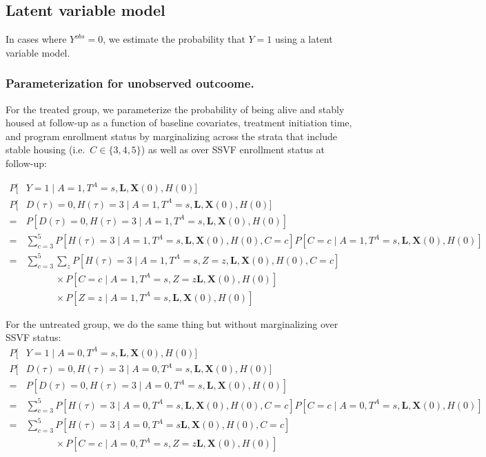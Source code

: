 
\subsection{Latent variable model}

In cases where $Y^{obs}=0$, we estimate the probability that $Y=1$ using a latent variable model. 

\subsubsection{Parameterization for unobserved outcoome.}

For the treated group, we parameterize the probability of being alive and stably housed at follow-up as a function of baseline covariates, treatment initiation time, and program enrollment status by marginalizing across the strata that include stable housing (i.e.\ $C \in \{3,4,5\}$) as well as over SSVF enrollment status at follow-up:

\begin{align*}
    P[&Y=1 \mid A=1, T^A=s, \boldsymbol{L}, \boldsymbol{X}(0), H(0)] \\
    P[&D(\tau)=0, H(\tau)=3 \mid A=1, T^A=s, \boldsymbol{L}, \boldsymbol{X}(0), H(0)] \\
     =& P[D(\tau)=0, H(\tau)=3 \mid A=1, T^A=s, \boldsymbol{L}, \boldsymbol{X}(0), H(0)] \\
     =& \sum_{c=3}^5 P[H(\tau)=3 \mid A=1, T^A=s, \boldsymbol{L}, \boldsymbol{X}(0), H(0), C=c]P[C=c \mid A=1, T^A=s, \boldsymbol{L}, \boldsymbol{X}(0), H(0)] \\
     =& \sum_{c=3}^5 \sum_{z} P[H(\tau)=3 \mid A=1, T^A=s, Z=z, \boldsymbol{L}, \boldsymbol{X}(0), H(0), C=c]\\
     & \quad \quad \quad \times P[C=c \mid A=1, T^A=s, Z=z \boldsymbol{L}, \boldsymbol{X}(0), H(0)] \\
     &\quad \quad \quad \times P[Z=z \mid A=1, T^A=s, \boldsymbol{L}, \boldsymbol{X}(0), H(0)]
\end{align*}

For the untreated group, we do the same thing but without marginalizing over SSVF status:
\begin{align*}
    P[&Y=1 \mid A=0, T^A=s, \boldsymbol{L}, \boldsymbol{X}(0), H(0)] \\
    P[&D(\tau)=0, H(\tau)=3 \mid A=0, T^A=s, \boldsymbol{L}, \boldsymbol{X}(0), H(0)] \\
     =& P[D(\tau)=0, H(\tau)=3 \mid A=0, T^A=s, \boldsymbol{L}, \boldsymbol{X}(0), H(0)] \\
     =& \sum_{c=3}^5 P[H(\tau)=3 \mid A=0, T^A=s, \boldsymbol{L}, \boldsymbol{X}(0), H(0), C=c]P[C=c \mid A=0, T^A=s, \boldsymbol{L}, \boldsymbol{X}(0), H(0)] \\
     =& \sum_{c=3}^5  P[H(\tau)=3 \mid A=0, T^A=s \boldsymbol{L}, \boldsymbol{X}(0), H(0), C=c]\\
     & \quad \quad \quad \times P[C=c \mid A=0, T^A=s, Z=z \boldsymbol{L}, \boldsymbol{X}(0), H(0)]
\end{align*}


